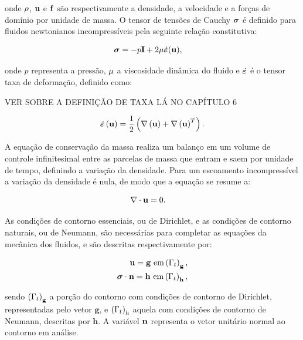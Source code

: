 \documentclass[tese_patricia]{subfiles}%
\begin{document}
\noindent onde $\rho$, $\mathbf{u}$ e $\mathbf{f}$ são respectivamente a densidade, a velocidade e a forças de domínio por unidade de massa. O tensor de tensões de Cauchy $\boldsymbol{\sigma}$ é definido para fluidos newtonianos incompressíveis pela seguinte relação constitutiva:

\begin{align}
\boldsymbol{\sigma} &= -p\mathbf{I} + 2\mu\dot{\bm{\varepsilon}}(\mathbf{u}),\label{eq:StressTensor}
\end{align}

\noindent onde $p$ representa a pressão, $\mu$ a viscosidade dinâmica do fluido e $\dot{\bm{\varepsilon}}$ é o tensor taxa de deformação, definido como:

VER SOBRE A DEFINIÇÃO DE TAXA LÁ NO CAPÍTULO 6

\begin{align}
\dot{\bm{\varepsilon}}\left(\mathbf{u}\right) = \frac{1}{2}\left(\nabla\left(\mathbf{u}\right) + \nabla\left(\mathbf{u}\right)^{T}\right). 
\label{eq:StrainTensor}
\end{align}

A equação de conservação da massa realiza um balanço em um volume de controle infinitesimal entre as parcelas de massa que entram e saem por unidade de tempo, definindo a variação da densidade. Para um escoamento incompressível a variação da densidade é nula, de modo que a equação se resume a:

\begin{align}
\nabla \cdot \mathbf{u} &= 0. 
\end{align}

As condições de contorno essenciais, ou de Dirichlet, e as condições de contorno naturais, ou de Neumann, são necessárias para completar as equações da mecânica dos fluidos, e são descritas respectivamente por:

\begin{align}
\mathbf{u} = \mathbf{g} \textrm { em} \left(\Gamma_{t}\right)_{\mathbf{g}} \label{eq:Dir},\\
\boldsymbol{\sigma} \cdot \mathbf{n} = \mathbf{h} \textrm{ em} \left(\Gamma_{t}\right)_{\mathbf{h}}, \label{eq:Neu}
\end{align}

\noindent sendo $\left(\Gamma_{t}\right)_{\mathbf{g}}$ a porção do contorno com condições de contorno de Dirichlet, representadas pelo vetor $\mathbf{g}$, e $\left(\Gamma_{t}\right)_{h}$ aquela com condições de contorno de Neumann, descritas por $\mathbf{h}$. A variável $\mathbf{n}$ representa o vetor unitário normal ao contorno em análise.
\end{document}
